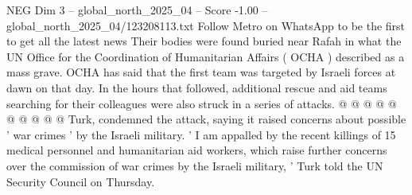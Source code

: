 \begin{textsample}{NEG Dim 3 – global\_north\_2025\_04 – Score -1.00 – global\_north\_2025\_04/123208113.txt}
Follow Metro on WhatsApp to be the first to get all the latest news Their bodies were found buried near Rafah in what the UN Office for the Coordination of Humanitarian Affairs ( OCHA ) described as a mass grave.
OCHA has said that the first team was targeted by Israeli forces at dawn on that day.
In the hours that followed, additional rescue and aid teams searching for their colleagues were also struck in a series of attacks. @ @ @ @ @ @ @ @ @ @ Turk, condemned the attack, saying it raised concerns about possible ' war crimes ' by the Israeli military. ' I am appalled by the recent killings of 15 medical personnel and humanitarian aid workers, which raise further concerns over the commission of war crimes by the Israeli military, ' Turk told the UN Security Council on Thursday.

\end{textsample}
